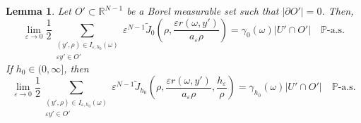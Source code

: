 \documentclass{article}
\numberwithin{equation}{section}
\newtheorem{lemma}[theorem]{Lemma}
\theoremstyle{definition}
\theoremstyle{remark}
\begin{document}
\begin{lemma} \label{lm:really_ugly_sum_limit}
    Let $O' \subset \mathbb{R}^{N - 1}$ be a Borel measurable set such that $|\partial O'| = 0$. Then,
    \begin{equation} \label{eq:really_ugly_sum_limit_zero}
        \lim_{\varepsilon \to 0} \frac{1}{2} \sum \limits_{\substack{(y', \rho) \in I_{\varepsilon, h_0}(\omega) \\ \varepsilon y' \in O'}} \varepsilon^{N - 1} \tilde{J}_0\left(\rho, \frac{\varepsilon r(\omega, y')}{a_\varepsilon \rho}\right) = \gamma_0(\omega) |U' \cap O'| \quad \mathbb{P}\text{-a.s.}
    \end{equation}
    If $h_0 \in (0, \infty]$, then
    \begin{equation} \label{eq:really_ugly_sum_limit_nonzero}
        \lim_{\varepsilon \to 0} \frac{1}{2} \sum \limits_{\substack{(y', \rho) \in I_{\varepsilon, h_0}(\omega) \\ \varepsilon y' \in O'}} \varepsilon^{N - 1} \tilde{J}_{h_0}\left(\rho, \frac{\varepsilon r(\omega, y')}{a_\varepsilon \rho}, \frac{h_\varepsilon}{\rho}\right) = \gamma_{h_0}(\omega) |U' \cap O'| \quad \mathbb{P}\text{-a.s.}
    \end{equation}
\end{lemma}
\end{document}
